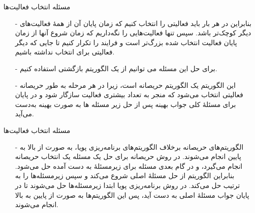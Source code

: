 \begin{frame}{‌مسئله انتخاب فعالیت‌ها}
\begin{itemize}\itemr
\item[-]
بنابراین در هر بار باید فعالیتی را انتخاب کنیم که زمان پایان آن از همهٔ فعالیت‌های دیگر کوچک‌تر باشد. سپس تنها فعالیت‌هایی را نگه‌داریم که زمان شروع آنها از زمان پایان فعالیت انتخاب شده بزرگ‌تر است و فرایند را تکرار کنیم تا جایی که دیگر فعالیتی برای انتخاب نداشته باشیم.
\item[-]
برای حل این مسئله می توانیم از یک الگوریتم بازگشتی استفاده کنیم.
\item[-]
این الگوریتم یک الگوریتم حریصانه است، زیرا در هر مرحله به طور حریصانه فعالیتی انتخاب می‌شود که منجر به تعداد بیشتری فعالیت سازگار شود و در پایان برای مسئلهٔ کلی جواب بهینه پس از حل زیر مسئله ها به صورت بهینه به‌دست می‌آید.
\end{itemize}
\end{frame}



\begin{frame}{‌مسئله انتخاب فعالیت‌ها}
\begin{itemize}\itemr
\item[-]
الگوریتم‌های حریصانه برخلاف الگوریتم‌های برنامه‌ریزی پویا، به صورت از بالا به پایین
انجام می‌شوند.
در روش حریصانه برای حل یک مسئله یک انتخاب حریصانه انجام می‌گیرد، و در گام بعدی مسئله برای زیرمسئلهٔ به دست آمده حل می‌شود.
بنابراین الگوریتم از حل مسئلهٔ اصلی شروع می‌کند و سپس زیرمسئله‌ها را به ترتیب حل می‌کند.
در روش برنامه‌ریزی پویا ابتدا زیرمسئله‌ها حل می‌شوند تا در پایان جواب مسئلهٔ اصلی به دست آید، پس این الگوریتم‌ها به صورت از پایین به بالا
انجام می‌شوند.
\end{itemize}
\end{frame}


